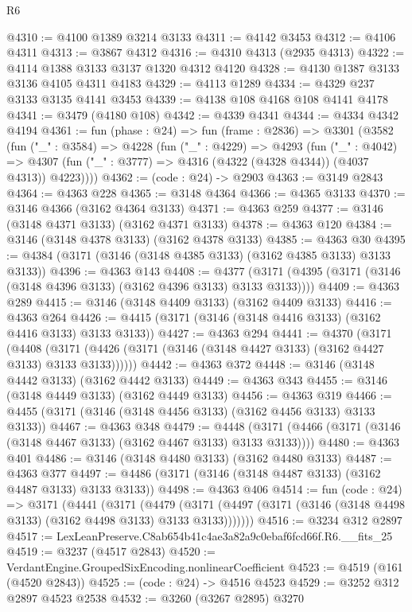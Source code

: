 \begin{lexlean}{R6}
\begin{coremodule}
@4310 := @4100 @1389 @3214 @3133
@4311 := @4142 @3453
@4312 := @4106 @4311
@4313 := @3867 @4312
@4316 := @4310 @4313 (@2935 @4313)
@4322 := @4114 @1388 @3133 @3137 @1320 @4312 @4120
@4328 := @4130 @1387 @3133 @3136 @4105 @4311 @4183
@4329 := @4113 @1289
@4334 := @4329 @237 @3133 @3135 @4141 @3453
@4339 := @4138 @108 @4168 @108 @4141 @4178
@4341 := @3479 (@4180 @108)
@4342 := @4339 @4341
@4344 := @4334 @4342 @4194
@4361 := fun (phase : @24) =>
  fun (frame : @2836) =>
  @3301
    (@3582
      (fun ("_" : @3584) =>
      @4228
        (fun ("_" : @4229) =>
        @4293
          (fun ("_" : @4042) =>
          @4307 (fun ("_" : @3777) => @4316 (@4322 (@4328 @4344)) (@4037 @4313)) @4223))))
@4362 := (code : @24) -> @2903
@4363 := @3149 @2843
@4364 := @4363 @228
@4365 := @3148 @4364
@4366 := @4365 @3133
@4370 := @3146 @4366 (@3162 @4364 @3133)
@4371 := @4363 @259
@4377 := @3146 (@3148 @4371 @3133) (@3162 @4371 @3133)
@4378 := @4363 @120
@4384 := @3146 (@3148 @4378 @3133) (@3162 @4378 @3133)
@4385 := @4363 @30
@4395 := @4384 (@3171 (@3146 (@3148 @4385 @3133) (@3162 @4385 @3133) @3133 @3133))
@4396 := @4363 @143
@4408 := @4377 (@3171 (@4395 (@3171 (@3146 (@3148 @4396 @3133) (@3162 @4396 @3133) @3133 @3133))))
@4409 := @4363 @289
@4415 := @3146 (@3148 @4409 @3133) (@3162 @4409 @3133)
@4416 := @4363 @264
@4426 := @4415 (@3171 (@3146 (@3148 @4416 @3133) (@3162 @4416 @3133) @3133 @3133))
@4427 := @4363 @294
@4441 := @4370
    (@3171
      (@4408 (@3171 (@4426 (@3171 (@3146 (@3148 @4427 @3133) (@3162 @4427 @3133) @3133 @3133))))))
@4442 := @4363 @372
@4448 := @3146 (@3148 @4442 @3133) (@3162 @4442 @3133)
@4449 := @4363 @343
@4455 := @3146 (@3148 @4449 @3133) (@3162 @4449 @3133)
@4456 := @4363 @319
@4466 := @4455 (@3171 (@3146 (@3148 @4456 @3133) (@3162 @4456 @3133) @3133 @3133))
@4467 := @4363 @348
@4479 := @4448 (@3171 (@4466 (@3171 (@3146 (@3148 @4467 @3133) (@3162 @4467 @3133) @3133 @3133))))
@4480 := @4363 @401
@4486 := @3146 (@3148 @4480 @3133) (@3162 @4480 @3133)
@4487 := @4363 @377
@4497 := @4486 (@3171 (@3146 (@3148 @4487 @3133) (@3162 @4487 @3133) @3133 @3133))
@4498 := @4363 @406
@4514 := fun (code : @24) =>
  @3171
    (@4441
      (@3171
        (@4479
          (@3171 (@4497 (@3171 (@3146 (@3148 @4498 @3133) (@3162 @4498 @3133) @3133 @3133)))))))
@4516 := @3234 @312 @2897
@4517 := LexLeanPreserve.C8ab654b41c4ae3a82a9c0ebaf6fcd66f.R6.__fits_25
@4519 := @3237 (@4517 @2843)
@4520 := VerdantEngine.GroupedSixEncoding.nonlinearCoefficient
@4523 := @4519 (@161 (@4520 @2843))
@4525 := (code : @24) -> @4516 @4523
@4529 := @3252 @312 @2897 @4523 @2538
@4532 := @3260 (@3267 @2895) @3270

\end{coremodule}
\end{lexlean}
